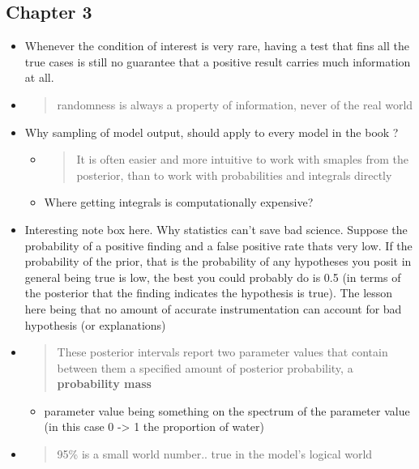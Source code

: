 \documentclass[11pt]{article}
\begin{document}
\hypertarget{chapter-3}{%
\subsection{Chapter 3}\label{chapter-3}}

\begin{itemize}
\item
  Whenever the condition of interest is very rare, having a test that
  fins all the true cases is still no guarantee that a positive result
  carries much information at all.
\item
  \begin{quote}
  randomness is always a property of information, never of the real
  world
  \end{quote}
\item
  Why sampling of model output, should apply to every model in the book
  ?

  \begin{itemize}
  \item
    \begin{quote}
    It is often easier and more intuitive to work with smaples from the
    posterior, than to work with probabilities and integrals directly
    \end{quote}
  \item
    Where getting integrals is computationally expensive?
  \end{itemize}
\item
  Interesting note box here. Why statistics can't save bad science.
  Suppose the probability of a positive finding and a false positive
  rate thats very low. If the probability of the prior, that is the
  probability of any hypotheses you posit in general being true is low,
  the best you could probably do is 0.5 (in terms of the posterior that
  the finding indicates the hypothesis is true). The lesson here being
  that no amount of accurate instrumentation can account for bad
  hypothesis (or explanations)
\item
  \begin{quote}
  These posterior intervals report two parameter values that contain
  between them a specified amount of posterior probability, a
  \textbf{probability mass}
  \end{quote}

  \begin{itemize}
  \tightlist
  \item
    parameter value being something on the spectrum of the parameter
    value (in this case 0 -\textgreater{} 1 the proportion of water)
  \end{itemize}
\item
  \begin{quote}
  95\% is a small world number.. true in the model's logical world
  \end{quote}


\end{itemize}
\end{document}
